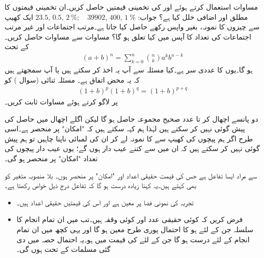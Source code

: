 \quad
مساوات  استعمال کرتے ہوئے  اور  کی تخمینی قیمتیں حاصل کریں۔ان تخمینی قیمتوں کا مطلق اور اضافی خلل کیا ہے؟
جواب:\quad
$23.5,\,0.5,\,\SI{2}{\percent};\quad \num{39902},\,400,\,\SI{1}{\percent}$
\quad
ایک کھیپ سے  چیزوں کا نمونہ، بغیر واپس رکھے حاصل کیا جاتا ہے۔مرتب اجتماعات اور غیر مرتب اجتماعات کی تعداد کا آپس میں کیا تعلق ہو گا؟
\quad
مساوات  سے مساوات  حاصل کریں۔
\quad {} \quad
{} کے تحت
\begin{align*}
(a+b)^n=\sum_{k=0}^{n}\binom{n}{k}a^kb^{n-k}
\end{align*}
ہو گا۔یوں  کا عددی سر  ہے۔کیا مسئلہ  سے آپ یہ اخذ کر سکتے ہیں یا آپ سمجھتے ہیں کہ یہ محض اتفاق ہے۔
\quad
مسئلہ ثنائی (سوال ) کو
\begin{align*}
(1+b)^p(1+b)^q=(1+b)^{p+q}
\end{align*}
پر لاگو کرتے ہوئے مساوات  ثابت کریں۔

دو پانسے اچھال کر  تا  عدد صحیح مجموعہ   حاصل ہو گا لیکن اگلے اچھال  میں حاصل   کی پیش گوئی نہیں کر سکتے ہیں لہٰذا ہم کہہ سکتے ہیں کہ  "امکان" پر منحصر ہے۔اسی طرح اگر ہم پیچوں کی کھیپ سے  کا نمونہ لے کر ان کی لمبائی ناپنا چاہیں تو ہم پیش گوئی نہیں کر سکتے ہیں کہ ان میں سے کتنے عیب دار ہوں گے؛ یوں عیب دار پیچوں کی تعداد  "امکان" پر منحصر ہو گی۔

   سے مراد ایسا تفاعل ہے جس کی قیمت حقیقی اعداد اور  "امکان" پر منحصر ہوں۔ بلا منصوبہ متغیر کو  بھی کہتے ہیں۔یہ کہنا زیادہ درست ہو گا کہ تفاعل  درج ذیل خواص رکھتا ہے۔
\begin{itemize}
\item
تجربہ کی نمونی فضا  پر  معین ہے اور اس کی قیمتیں حقیقی اعداد ہیں۔
\item
فرض کریں کہ  کوئی حقیقی عدد اور  کوئی وقفہ ہیں۔تب  میں ان تمام انجام کا سلسلہ جن کے لئے  ہو کا احتمال پوری طرح معین ہو گا اور یہی کچھ  میں ان تمام انجام کے لئے درست ہو گا جن کے لئے  کی قیمت  میں ہو۔یہ احتمال حصہ  میں دی گئی مسلمات کے تحت ہوں گی۔
\end{itemize}

